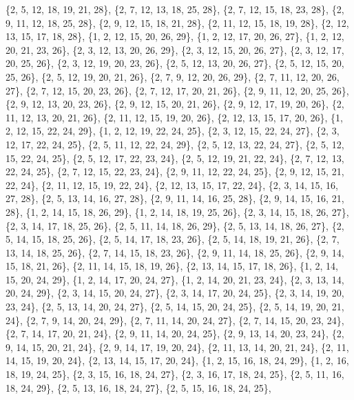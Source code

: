 \documentclass[11pt,a4paper]{article}
\begin{document}
{\{2, 5, 12, 18, 19, 21, 28\}, \{2, 7, 12, 13, 18, 25, 28\}, \{2, 7, 12, 15, 18, 23, 28\}, \{2, 9, 11, 12, 18, 25, 28\}, \{2, 9, 12, 15, 18, 21, 28\},
\{2, 11, 12, 15, 18, 19, 28\}, \{2, 12, 13, 15, 17, 18, 28\}, \{1, 2, 12, 15, 20, 26, 29\}, \{1, 2, 12, 17, 20, 26, 27\}, \{1, 2, 12, 20, 21, 23, 26\},
\{2, 3, 12, 13, 20, 26, 29\}, \{2, 3, 12, 15, 20, 26, 27\}, \{2, 3, 12, 17, 20, 25, 26\}, \{2, 3, 12, 19, 20, 23, 26\}, \{2, 5, 12, 13, 20, 26, 27\},
\{2, 5, 12, 15, 20, 25, 26\}, \{2, 5, 12, 19, 20, 21, 26\}, \{2, 7, 9, 12, 20, 26, 29\}, \{2, 7, 11, 12, 20, 26, 27\}, \{2, 7, 12, 15, 20, 23, 26\},
\{2, 7, 12, 17, 20, 21, 26\}, \{2, 9, 11, 12, 20, 25, 26\}, \{2, 9, 12, 13, 20, 23, 26\}, \{2, 9, 12, 15, 20, 21, 26\}, \{2, 9, 12, 17, 19, 20, 26\},
\{2, 11, 12, 13, 20, 21, 26\}, \{2, 11, 12, 15, 19, 20, 26\}, \{2, 12, 13, 15, 17, 20, 26\}, \{1, 2, 12, 15, 22, 24, 29\}, \{1, 2, 12, 19, 22, 24, 25\},
\{2, 3, 12, 15, 22, 24, 27\}, \{2, 3, 12, 17, 22, 24, 25\}, \{2, 5, 11, 12, 22, 24, 29\}, \{2, 5, 12, 13, 22, 24, 27\}, \{2, 5, 12, 15, 22, 24, 25\},
\{2, 5, 12, 17, 22, 23, 24\}, \{2, 5, 12, 19, 21, 22, 24\}, \{2, 7, 12, 13, 22, 24, 25\}, \{2, 7, 12, 15, 22, 23, 24\}, \{2, 9, 11, 12, 22, 24, 25\},
\{2, 9, 12, 15, 21, 22, 24\}, \{2, 11, 12, 15, 19, 22, 24\}, \{2, 12, 13, 15, 17, 22, 24\}, \{2, 3, 14, 15, 16, 27, 28\}, \{2, 5, 13, 14, 16, 27, 28\},
\{2, 9, 11, 14, 16, 25, 28\}, \{2, 9, 14, 15, 16, 21, 28\}, \{1, 2, 14, 15, 18, 26, 29\}, \{1, 2, 14, 18, 19, 25, 26\}, \{2, 3, 14, 15, 18, 26, 27\},
\{2, 3, 14, 17, 18, 25, 26\}, \{2, 5, 11, 14, 18, 26, 29\}, \{2, 5, 13, 14, 18, 26, 27\}, \{2, 5, 14, 15, 18, 25, 26\}, \{2, 5, 14, 17, 18, 23, 26\},
\{2, 5, 14, 18, 19, 21, 26\}, \{2, 7, 13, 14, 18, 25, 26\}, \{2, 7, 14, 15, 18, 23, 26\}, \{2, 9, 11, 14, 18, 25, 26\}, \{2, 9, 14, 15, 18, 21, 26\},
\{2, 11, 14, 15, 18, 19, 26\}, \{2, 13, 14, 15, 17, 18, 26\}, \{1, 2, 14, 15, 20, 24, 29\}, \{1, 2, 14, 17, 20, 24, 27\}, \{1, 2, 14, 20, 21, 23, 24\},
\{2, 3, 13, 14, 20, 24, 29\}, \{2, 3, 14, 15, 20, 24, 27\}, \{2, 3, 14, 17, 20, 24, 25\}, \{2, 3, 14, 19, 20, 23, 24\}, \{2, 5, 13, 14, 20, 24, 27\},
\{2, 5, 14, 15, 20, 24, 25\}, \{2, 5, 14, 19, 20, 21, 24\}, \{2, 7, 9, 14, 20, 24, 29\}, \{2, 7, 11, 14, 20, 24, 27\}, \{2, 7, 14, 15, 20, 23, 24\},
\{2, 7, 14, 17, 20, 21, 24\}, \{2, 9, 11, 14, 20, 24, 25\}, \{2, 9, 13, 14, 20, 23, 24\}, \{2, 9, 14, 15, 20, 21, 24\}, \{2, 9, 14, 17, 19, 20, 24\},
\{2, 11, 13, 14, 20, 21, 24\}, \{2, 11, 14, 15, 19, 20, 24\}, \{2, 13, 14, 15, 17, 20, 24\}, \{1, 2, 15, 16, 18, 24, 29\}, \{1, 2, 16, 18, 19, 24, 25\},
\{2, 3, 15, 16, 18, 24, 27\}, \{2, 3, 16, 17, 18, 24, 25\}, \{2, 5, 11, 16, 18, 24, 29\}, \{2, 5, 13, 16, 18, 24, 27\}, \{2, 5, 15, 16, 18, 24, 25\},
}
\end{document}
